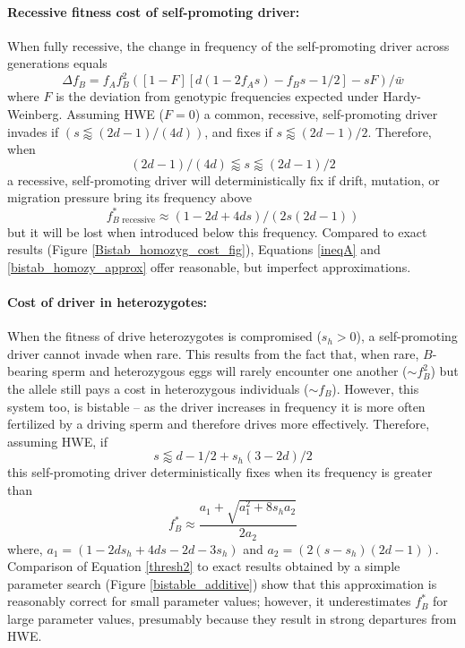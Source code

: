 \documentclass[12pt,letterpaper]{article}
\begin{document}
\paragraph{Recessive fitness cost of self-promoting driver:} 
When fully recessive, the change in frequency of the self-promoting driver across generations equals 
\begin{equation}
\Delta f_B=f_A f_B^2 \left( [1-F][ d(1-2 f_A s) - f_B s-1/2] - s  F \right)/\bar{w}
\label{deltadriver}
\end{equation}
where $F$ is the deviation from genotypic frequencies expected under Hardy-Weinberg. 
Assuming HWE  ($F=0$) a common, recessive, self-promoting driver invades if $\left(s\lessapprox\left(2 d - 1\right)/\left(4 d\right)\right)$, and fixes if
 $s\lessapprox(2d-1)/2$. 
 Therefore, when 
\begin{equation}
(2 d - 1)/(4 d)  \lessapprox  s  \lessapprox  (2d-1)/2\label{ineqA}
\end{equation} 
a recessive, self-promoting driver will deterministically fix if drift,
 	mutation, or migration pressure bring its frequency above
\begin{equation} 
f^*_{B\text{ recessive}} \approx (1-2d+4ds)/(2s(2d-1)) \label{bistab_homozy_approx}
\end{equation}
 but it will be lost when introduced below this frequency. 
Compared to exact results (Figure \ref{Bistab_homozyg_cost_fig}), Equations
 \eqref{ineqA} and \eqref{bistab_homozy_approx} offer reasonable, but imperfect approximations. 

\paragraph{Cost of driver in heterozygotes:} 
When the fitness of drive heterozygotes is compromised ($s_h>0$), a self-promoting driver cannot invade when rare.
This results from the fact that,
when rare, %
$B$-bearing sperm and heterozygous eggs will rarely encounter one another ($\sim f_B^2$) but the allele still pays a
cost in heterozygous individuals ($\sim f_B$). 
However, this system too, is bistable -- as the driver increases in frequency it is more often fertilized by a driving sperm and therefore drives more effectively. 
Therefore, assuming HWE, if 
\begin{equation}
	s \lessapprox  d -1/2 +s_h(3-2d)/2
	\label{sForHetFix}
\end{equation}
this self-promoting driver deterministically fixes when its frequency is greater than
\begin{equation}
	f_B^* \approx \frac{a_1+\sqrt{a_1^2+8 s_h a_2}}{2 a_2}
	\label{thresh2}
\end{equation}
where, $a_1=\left(1-2 ds_h+4 d s-2 d-3 s_h\right)$ and $a_2=\left(2\left(s-s_h\right)\left(2d-1\right)\right)$.
Comparison of Equation \ref{thresh2} to exact results obtained by a
simple parameter search (Figure \ref{bistable_additive})
show that this approximation is reasonably correct for small
parameter values; however, it underestimates $f_B^*$ for large parameter values, presumably because they result in strong departures from HWE.
\end{document}
